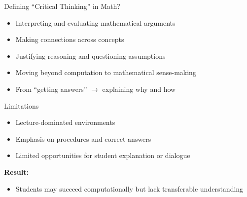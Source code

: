 \documentclass[dvipsnames]{beamer}
\begin{document}

\begin{frame}{Defining “Critical Thinking” in Math?}
\begin{itemize}
    \item Interpreting and evaluating mathematical arguments
    \item Making connections across concepts
    \item Justifying reasoning and questioning assumptions
    \item Moving beyond computation to mathematical sense-making
\end{itemize}

\vspace{0.5cm}

\begin{itemize}
    \item From “getting answers” $\rightarrow$ explaining why and how
\end{itemize}
\end{frame}


\begin{frame}{Limitations}
\begin{itemize}
    \item Lecture-dominated environments
    \item Emphasis on procedures and correct answers
    \item Limited opportunities for student explanation or dialogue
\end{itemize}

\vspace{0.5cm}

\textbf{Result:}
\begin{itemize}
    \item Students may succeed computationally but lack transferable understanding
\end{itemize}
\end{frame}

\end{document}
